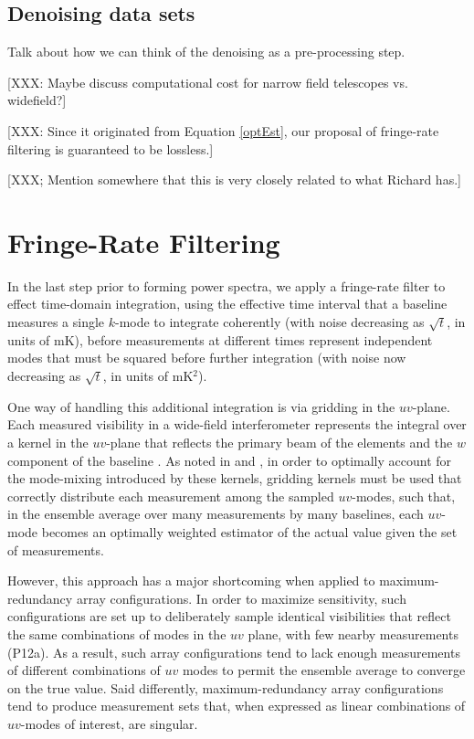 \documentclass[twocolumn,numberedappendix]{emulateapj}
\begin{document}
\subsection{Denoising data sets}
Talk about how we can think of the denoising as a pre-processing step.

[XXX: Maybe discuss computational cost for narrow field telescopes vs. widefield?]

[XXX: Since it originated from Equation \eqref{optEst}, our proposal of fringe-rate filtering is guaranteed to be lossless.]

[XXX; Mention somewhere that this is very closely related to what Richard has.]

\section{Fringe-Rate Filtering}
\label{sec:fringe_rate_filtering}

In the last step prior to forming power spectra,
we apply a fringe-rate filter to effect time-domain integration,
using the effective time interval that a baseline measures a single $k$-mode to integrate coherently
(with noise decreasing
as $\sqrt{t}$, in units of mK), before measurements at different times represent independent modes
that must be squared before further integration (with noise now decreasing as $\sqrt{t}$, in units of mK$^2$).

One way of handling this additional integration is via gridding in the $uv$-plane.
Each measured visibility in a wide-field interferometer represents the integral over a kernel in
the $uv$-plane that reflects the primary beam of the elements \citep{bhatnagar_et_al2008,morales_matejek2009} and the $w$ component 
of the baseline \citep{cornwell_et_al2003}.  As noted in
\citet{sullivan_et_al2012} and \citet{morales_matejek2009},
in order to optimally account for the mode-mixing introduced by these kernels, gridding kernels must be
used that correctly distribute each measurement among the sampled $uv$-modes, such that, in the ensemble average
over many measurements by many baselines, each $uv$-mode becomes an optimally weighted estimator of the actual
value given the set of measurements.

However, this approach has a major shortcoming when applied to maximum-redundancy array configurations.
In order
to maximize sensitivity, such
configurations are set up to deliberately sample identical visibilities that reflect the same 
combinations of modes in the $uv$ plane, with few nearby measurements (P12a).  As a result,
such array configurations tend to lack enough measurements of different combinations of $uv$ modes
to permit the ensemble average to converge on the true value.  Said differently, maximum-redundancy
array configurations tend to produce measurement sets that, when expressed as linear combinations
of $uv$-modes of interest, are singular.
\end{document}
